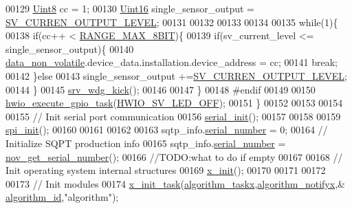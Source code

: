 \begin{DoxyCode}
00129     \hyperlink{a00072_af84840501dec18061d18a68c162a8fa2}{Uint8}  cc = 1;
00130     \hyperlink{a00072_a59a9f6be4562c327cbfb4f7e8e18f08b}{Uint16} single\_sensor\_output =  \hyperlink{a00021_a648a6327bd26d3d2f537bbea230c6ffb}{SV\_CURREN\_OUTPUT\_LEVEL};
00131 
00132 
00133 
00134    
00135             \textcolor{keywordflow}{while}(1)\{
00138                  \textcolor{keywordflow}{if}(cc++ < \hyperlink{a00021_ae0c75a1cb44e5d3f00ec7c9e40acfda8}{RANGE\_MAX\_8BIT})\{
00139                      \textcolor{keywordflow}{if}(sv\_current\_level <= single\_sensor\_output)\{
00140                          \hyperlink{a00060_a76ac5f917f5308dcd83de0d7c94559fb}{data\_non\_volatile}.device\_data.installation.device\_address = cc;
00141                          \textcolor{keywordflow}{break};
00142                      \}\textcolor{keywordflow}{else}
00143                         single\_sensor\_output +=\hyperlink{a00021_a648a6327bd26d3d2f537bbea230c6ffb}{SV\_CURREN\_OUTPUT\_LEVEL};
00144                  \}
00145               \hyperlink{a00067_a710d148845397582739d170341f3d3d9}{srv\_wdg\_kick}();
00146         
00147             \}
00148 \textcolor{preprocessor}{    #endif}
00149 
00150     \hyperlink{a00058_a0af9eae455fbdf4e77def5bfffa109cb}{hwio\_execute\_gpio\_task}(\hyperlink{a00058_a8fe69ad7e533d2e88cec53c22a56f8fb}{HWIO\_SV\_LED\_OFF});
00151     \}
00152 
00153        
00154  
00155     \textcolor{comment}{// Init serial port communication}
00156     \hyperlink{a00031_ad2b461e9e9044364a28a61cfadcacdd8}{serial\_init}();
00157    
00158 
00159     \hyperlink{a00013_ae909944aa85ae98323073c628be541aa}{spi\_init}();
00160 
00161 
00162   
00163     sqtp\_info.\hyperlink{a00033_a728c5fe7bc16e168a8f93fba18ee5561}{serial\_number} = 0;
00164     \textcolor{comment}{// Initialize SQPT production info}
00165     sqtp\_info.\hyperlink{a00033_a728c5fe7bc16e168a8f93fba18ee5561}{serial\_number} = \hyperlink{a00029_a86b863ea185628aff5a00b4defbbb6e1}{nov\_get\_serial\_number}();
00166     \textcolor{comment}{//TODO:what to do if empty}
00167  
00168     \textcolor{comment}{// Init operating system internal structures}
00169     \hyperlink{a00036_a05f27d3148e368ee84a448f3c4b083dd}{x\_init}();        
00170     
00171     
00172 
00173     \textcolor{comment}{// Init modules}
00174     \hyperlink{a00036_a1e79db5ed3ab326586129eb4d7b63d46}{x\_init\_task}(\hyperlink{a00021_a1d182ae18a9176c2a1e28cc654dc0e43}{algorithm\_taskx},\hyperlink{a00021_a93269cdec3e21934aa9395440a2de605}{algorithm\_notifyx},&
      \hyperlink{a00021_aff3e3d622fcd96787628167d3c1856f9}{algorithm\_id},\textcolor{stringliteral}{"algorithm"});

\end{DoxyCode}
